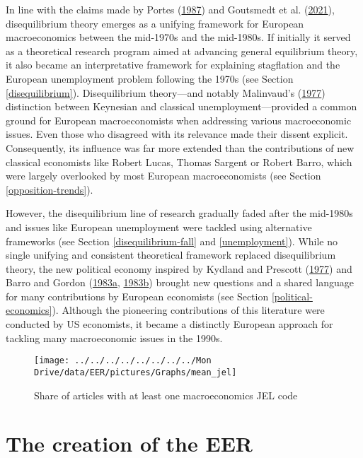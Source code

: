 \documentclass[
  12pt,
  onecolumn]{article}
\begin{document}
In line with the claims made by Portes
(\protect\hyperlink{ref-portes1987}{1987}) and Goutsmedt et al.
(\protect\hyperlink{ref-goutsmedt2021}{2021}), disequilibrium theory
emerges as a unifying framework for European macroeconomics between the
mid-1970s and the mid-1980s. If initially it served as a theoretical
research program aimed at advancing general equilibrium theory, it also
became an interpretative framework for explaining stagflation and the
European unemployment problem following the 1970s (see Section
\ref{disequilibrium}). Disequilibrium theory---and notably Malinvaud's
(\protect\hyperlink{ref-malinvaud1977}{1977}) distinction between
Keynesian and classical unemployment---provided a common ground for
European macroeconomists when addressing various macroeconomic issues.
Even those who disagreed with its relevance made their dissent explicit.
Consequently, its influence was far more extended than the contributions
of new classical economists like Robert Lucas, Thomas Sargent or Robert
Barro, which were largely overlooked by most European macroeconomists
(see Section \ref{opposition-trends}).

However, the disequilibrium line of research gradually faded after the
mid-1980s and issues like European unemployment were tackled using
alternative frameworks (see Section \ref{disequilibrium-fall} and
\ref{unemployment}). While no single unifying and consistent theoretical
framework replaced disequilibrium theory, the new political economy
inspired by Kydland and Prescott
(\protect\hyperlink{ref-kydland1977}{1977}) and Barro and Gordon
(\protect\hyperlink{ref-barro1983}{1983a},
\protect\hyperlink{ref-barro1983c}{1983b}) brought new questions and a
shared language for many contributions by European economists (see
Section \ref{political-economics}). Although the pioneering
contributions of this literature were conducted by US economists, it
became a distinctly European approach for tackling many macroeconomic
issues in the 1990s.

\begin{figure}[h]

{\centering \texttt{[image: ../../../../../../../../Mon Drive/data/EER/pictures/Graphs/mean\_jel]} 

}

\caption{Share of articles with at least one macroeconomics JEL code}\label{fig:plot-jel}
\end{figure}

\hypertarget{EER-creation}{%
\section{The creation of the EER}\label{EER-creation}}
\end{document}
